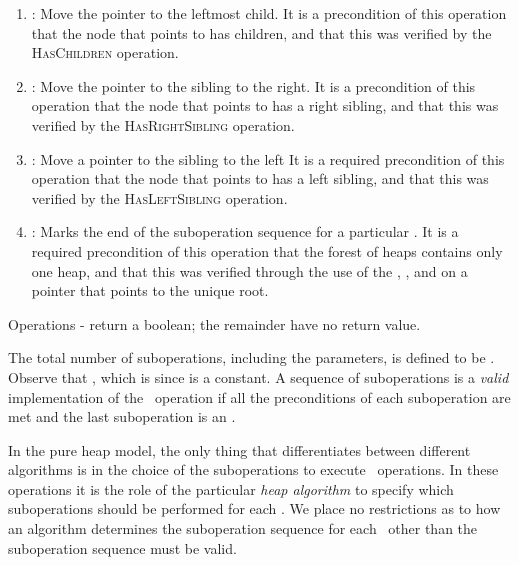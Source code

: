 \begin{fullonly}
\begin{enumerate}
\item {}: Move the pointer  to the leftmost child.
It is a precondition of this operation that the node that  points to has children, and that this was verified by the \textsc{HasChildren} operation.


\item {}: Move the pointer  to the sibling to the right.
It is a precondition of this operation that the node that  points to has a right sibling, and that this was verified by the \textsc{HasRightSibling} operation.


\item {}:  Move a pointer  to the sibling to the left
It is a required precondition of this operation that the node that  points to has a left sibling, and that this was verified by the \textsc{HasLeftSibling} operation.


\item {}:  Marks the end of the suboperation sequence for a particular \opEm.
It is a required precondition of this operation that the forest of heaps contains only one heap, and that this was verified through the use of the , , and  on a pointer  that points to the unique root.

\end{enumerate}

Operations - return a boolean; the remainder have no return value.

\end{fullonly}
The total number of suboperations, including the parameters, is defined to be . Observe that , which is  since  is a constant. 
A sequence of suboperations is a \emph{valid} implementation of the \opEm\ operation if all the preconditions of each suboperation are met and the last suboperation is an .




In the pure heap model, the only thing that differentiates between different algorithms is in the choice of the suboperations to execute \opEm\ operations. In these operations it is the role of the particular \emph{heap algorithm} to specify which suboperations should be performed for each \opEm. We place no restrictions as to how an algorithm determines the suboperation sequence for each \opEm\ other than the suboperation sequence must be valid.

